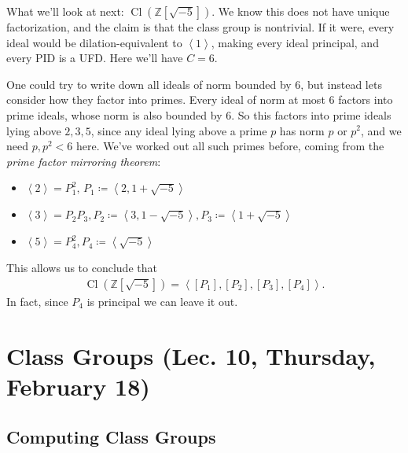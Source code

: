 \begin{example}[?]

What we'll look at next:
\(\operatorname{Cl}( {\mathbb{Z}}[ \sqrt{-5} ])\). We know this does not
have unique factorization, and the claim is that the class group is
nontrivial. If it were, every ideal would be dilation-equivalent to
\(\left\langle{ 1 }\right\rangle\), making every ideal principal, and
every PID is a UFD. Here we'll have \(C=6\).

\hfill\break

One could try to write down all ideals of norm bounded by 6, but instead
lets consider how they factor into primes. Every ideal of norm at most 6
factors into prime ideals, whose norm is also bounded by 6. So this
factors into prime ideals lying above \(2,3,5\), since any ideal lying
above a prime \(p\) has norm \(p\) or \(p^2\), and we need
\(p, p^2 < 6\) here. We've worked out all such primes before, coming
from the \emph{prime factor mirroring theorem}:

\begin{itemize}
\tightlist
\item
  \(\left\langle{ 2 }\right\rangle= P_1^2,\, P_1 \coloneqq\left\langle{ 2, 1 + \sqrt{-5} }\right\rangle\)
\item
  \(\left\langle{ 3 }\right\rangle = P_2 P_3, P_2 \coloneqq\left\langle{ 3, 1 - \sqrt{-5} }\right\rangle, P_3 \coloneqq\left\langle{ 1 + \sqrt{-5} }\right\rangle\)
\item
  \(\left\langle{ 5 }\right\rangle= P_4^2, P_4 \coloneqq\left\langle{ \sqrt{-5} }\right\rangle\)
\end{itemize}

This allows us to conclude that
\begin{align*}
\operatorname{Cl}({\mathbb{Z}}[ \sqrt{-5} ]) = \left\langle{ [P_1], [P_2], [P_3], [P_4] }\right\rangle
.\end{align*}
In fact, since \(P_4\) is principal we can leave it out.

\end{example}

\hypertarget{class-groups-lec.-10-thursday-february-18}{%
\section{Class Groups (Lec. 10, Thursday, February
18)}\label{class-groups-lec.-10-thursday-february-18}}

\hypertarget{computing-class-groups}{%
\subsection{Computing Class Groups}\label{computing-class-groups}}

